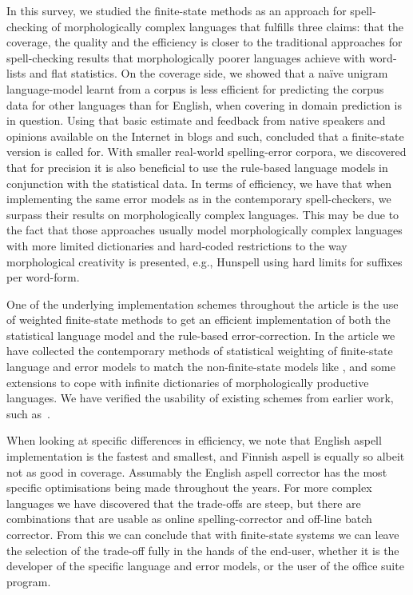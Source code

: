 \documentclass[a4paper,12pt]{article}
\begin{document}
In this survey, we studied the finite-state methods as an approach for
spell-checking of morphologically complex languages that fulfills three claims:
that the coverage, the quality and the efficiency is closer to the traditional
approaches for spell-checking results that morphologically poorer languages
achieve with word-lists and flat statistics. On the coverage side, we showed
that a naïve unigram language-model learnt from a corpus is less efficient for
predicting the corpus data for other languages than for English, when covering
in domain prediction is in question. Using that basic estimate and feedback
from native speakers and opinions available on the Internet in blogs and such,
concluded that a finite-state version is called for. With smaller real-world
spelling-error corpora, we discovered that for precision it is also beneficial
to use the rule-based language models in conjunction with the statistical data.
In terms of efficiency, we have  that when implementing the same error models
as in the contemporary spell-checkers, we surpass their results on
morphologically complex languages.  This may be due to the fact that those
approaches usually model morphologically complex languages with more limited
dictionaries and hard-coded restrictions to the way morphological creativity is
presented, e.g., Hunspell using hard limits for suffixes per word-form.

One of the underlying implementation schemes throughout the article is the use
of weighted finite-state methods to get an efficient implementation of both the
statistical language model and the rule-based error-correction. In the article
we have collected the contemporary methods of statistical weighting of
finite-state language and error models to match the non-finite-state models
like \cite{church1991probability}, and some extensions to cope with infinite
dictionaries of morphologically productive languages. We have verified the
usability of existing schemes from earlier work, such
as~\cite{pirinen/2009/nodalida,pirinen/2010/lrec}.

When looking at specific differences in efficiency, we note that English aspell
implementation is the fastest and smallest, and Finnish aspell is equally so
albeit not as good in coverage. Assumably the English aspell corrector has the
most specific optimisations being made throughout the years. For more complex
languages we have discovered that the trade-offs are steep, but there are
combinations that are usable as online spelling-corrector and off-line batch
corrector.  From this we can conclude that with finite-state systems we can
leave the selection of the trade-off fully in the hands of the end-user,
whether it is the developer of the specific language and error models, or the
user of the office suite program.
\end{document}
